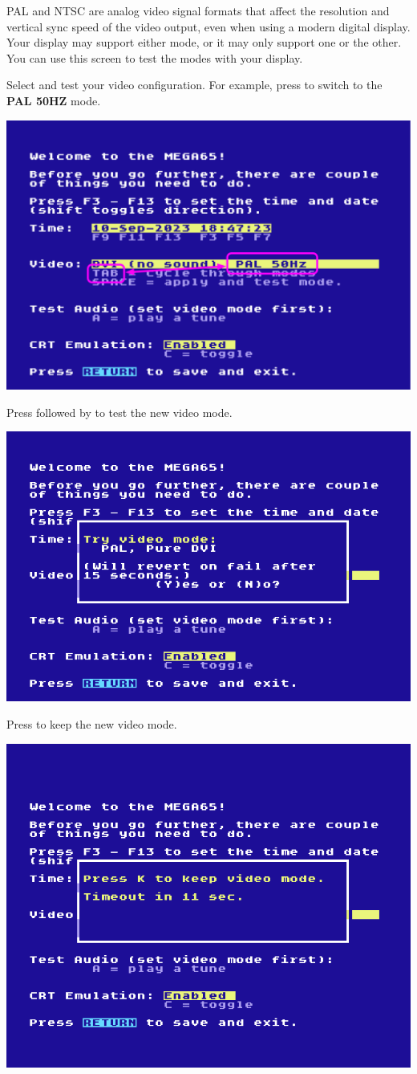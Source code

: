 PAL and NTSC are analog video signal formats that affect the resolution and vertical sync speed of the video output, even when using a modern digital display. Your display may support either mode, or it may only support one or the other. You can use this screen to test the modes with your display.

Select and test your video configuration. For example, press  to switch to the {\bf PAL 50HZ} mode.
\begin{center}
  \includegraphics[width=0.7\linewidth]{images/img011_final_boot_02.png}
\end{center}

Press  followed by  to test the new video mode.

\begin{center}
  \includegraphics[width=0.7\linewidth]{images/img011_final_boot_03.png}
\end{center}

Press  to keep the new video mode.

\begin{center}
  \includegraphics[width=0.7\linewidth]{images/img011_final_boot_04.png}
\end{center}

